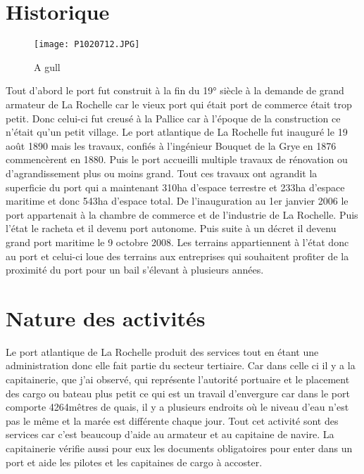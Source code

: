 
\section{Historique}

\begin{wrapfigure}{r}{0.5\textwidth}
    \begin{center}
        \texttt{[image: P1020712.JPG]}
        \end{center}
    \caption{A gull}
\end{wrapfigure}

Tout d'abord le port fut construit à la fin du 19° siècle à la demande de grand armateur de La Rochelle 
car le vieux port qui était port de commerce était trop petit.
Donc celui-ci fut creusé à la Pallice car à l'époque de la construction ce n'était qu'un petit village.
Le port atlantique de La Rochelle fut inauguré le 19 août 1890 mais les travaux, 
confiés à l'ingénieur Bouquet de la Grye en 1876 commencèrent en 1880.
Puis le port accueilli multiple travaux de rénovation ou d'agrandissement plus ou moins grand.
Tout ces travaux ont agrandit la superficie du port qui a maintenant 310ha d'espace terrestre et 233ha
d'espace maritime et donc 543ha d'espace total.
De l'inauguration au 1er janvier 2006 le port appartenait à la chambre de commerce et de l’industrie de La Rochelle.
Puis l'état le racheta et il devenu port autonome.
Puis suite à un décret il devenu grand port maritime le 9 octobre 2008.
Les terrains appartiennent à l'état donc au port et celui-ci loue des terrains
aux entreprises qui souhaitent profiter de la proximité du port pour un bail s’élevant à plusieurs années.

\section{Nature des activités}
Le port atlantique de La Rochelle produit des services tout en étant une administration
donc elle fait partie du secteur tertiaire.
Car dans celle ci il y a la capitainerie, que j'ai observé, qui représente l'autorité portuaire
et le placement des cargo ou bateau plus petit ce qui est un travail d'envergure
car dans le port comporte 4264mêtres de quais,
il y a  plusieurs endroits où le niveau d'eau n'est pas le même et la marée est différente chaque jour.
Tout cet activité sont des services car c'est beaucoup d'aide au armateur et au capitaine de navire.
La capitainerie vérifie aussi pour eux les documents obligatoires pour enter dans un port
et aide les pilotes et les capitaines de cargo à accoster.

